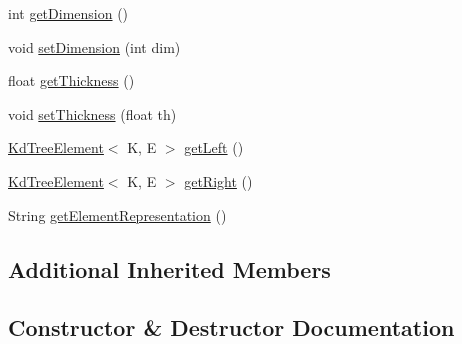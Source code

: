 \begin{DoxyCompactItemize}
\item 
int \hyperlink{classbridges_1_1base_1_1_kd_tree_element_a2469fcfe38e921ae48338ef1fd347c4a}{get\+Dimension} ()
\item 
void \hyperlink{classbridges_1_1base_1_1_kd_tree_element_af3fa89cbd20fc2c3f30784db16b6dec4}{set\+Dimension} (int dim)
\item 
float \hyperlink{classbridges_1_1base_1_1_kd_tree_element_a27c0b086af284210855ee5f1c90e7484}{get\+Thickness} ()
\item 
void \hyperlink{classbridges_1_1base_1_1_kd_tree_element_a52412fc59c743a8a0ede057ed2451be9}{set\+Thickness} (float th)
\item 
\hyperlink{classbridges_1_1base_1_1_kd_tree_element}{Kd\+Tree\+Element}$<$ K, E $>$ \hyperlink{classbridges_1_1base_1_1_kd_tree_element_a257367edc8f204c973eb277dcb5d37be}{get\+Left} ()
\item 
\hyperlink{classbridges_1_1base_1_1_kd_tree_element}{Kd\+Tree\+Element}$<$ K, E $>$ \hyperlink{classbridges_1_1base_1_1_kd_tree_element_a990694a36d44aba5f844f1752692c8e6}{get\+Right} ()
\item 
String \hyperlink{classbridges_1_1base_1_1_kd_tree_element_adf9bed8c71a7c257a1359c3c88b808f0}{get\+Element\+Representation} ()
\end{DoxyCompactItemize}
\subsection*{Additional Inherited Members}


\subsection{Constructor \& Destructor Documentation}
\mbox{\label{classbridges_1_1base_1_1_kd_tree_element_a6acdec52089792d20747c10f56139217}} 
